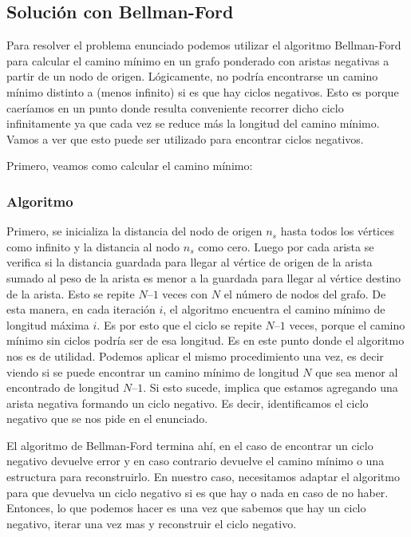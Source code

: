 \documentclass[titlepage,a4paper]{article}
\begin{document}
\subsection{Solución con Bellman-Ford}
\label{sec:org6cb066f}
Para resolver el problema enunciado podemos utilizar el algoritmo Bellman-Ford
para calcular el camino mínimo en un grafo ponderado con aristas negativas a
partir de un nodo de origen. Lógicamente, no podría encontrarse un camino mínimo
distinto a (menos infinito) si es que hay ciclos negativos. Esto es porque
caeríamos en un punto donde resulta conveniente recorrer dicho ciclo
infinitamente ya que cada vez se reduce más la longitud del camino mínimo. Vamos
a ver que esto puede ser utilizado para encontrar ciclos negativos.


\hfill

Primero, veamos como calcular el camino mínimo:

\subsubsection{Algoritmo}
\label{sec:orgc16128d}

Primero, se inicializa la distancia del nodo de origen \(n_s\) hasta todos los
vértices como infinito y la distancia al nodo \(n_s\) como cero. Luego por cada
arista se verifica si la distancia guardada para llegar al vértice de origen de
la arista sumado al peso de la arista es menor a la guardada para llegar al
vértice destino de la arista. Esto se repite \(N – 1\) veces con \(N\) el número de
nodos del grafo. De esta manera, en cada iteración \(i\), el algoritmo encuentra el
camino mínimo de longitud máxima \(i\). Es por esto que el ciclo se repite \(N – 1\)
veces, porque el camino mínimo sin ciclos podría ser de esa longitud. Es en este
punto donde el algoritmo nos es de utilidad. Podemos aplicar el mismo
procedimiento una vez, es decir viendo si se puede encontrar un camino mínimo de
longitud \(N\) que sea menor al encontrado de longitud \(N – 1\). Si esto sucede,
implica que estamos agregando una arista negativa formando un ciclo negativo. Es
decir, identificamos el ciclo negativo que se nos pide en el enunciado.

\hfill

El algoritmo de Bellman-Ford termina ahí, en el caso de encontrar un ciclo
negativo devuelve error y en caso contrario devuelve el camino mínimo o una
estructura para reconstruirlo. En nuestro caso, necesitamos adaptar el algoritmo
para que devuelva un ciclo negativo si es que hay o nada en caso de no haber.
Entonces, lo que podemos hacer es una vez que sabemos que hay un ciclo negativo,
iterar una vez mas y reconstruir el ciclo negativo.
\end{document}
